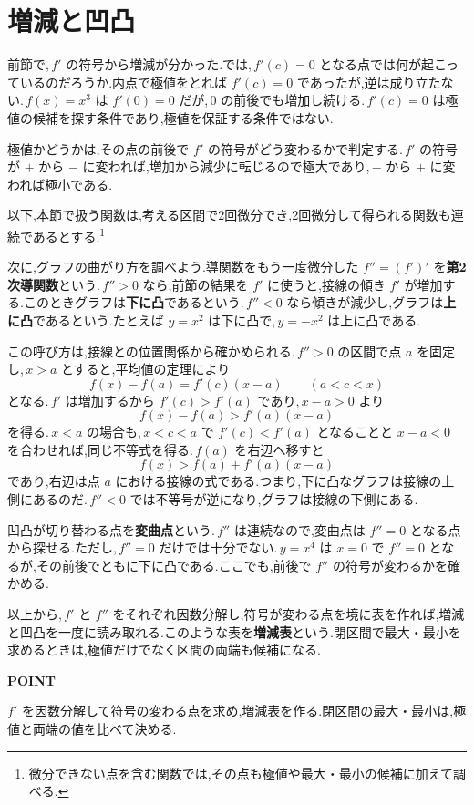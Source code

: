 \section{増減と凹凸}\label{節:増減凹凸}
前節で,\,$f'$ の符号から増減が分かった.では,\,$f'(c)=0$ となる点では何が起こっているのだろうか.内点で極値をとれば $f'(c)=0$ であったが,逆は成り立たない.\,$f(x)=x^3$ は $f'(0)=0$ だが,\,$0$ の前後でも増加し続ける.\,$f'(c)=0$ は極値の候補を探す条件であり,極値を保証する条件ではない.

極値かどうかは,その点の前後で $f'$ の符号がどう変わるかで判定する.\,$f'$ の符号が $+$ から $-$ に変われば,増加から減少に転じるので極大であり,\,$-$ から $+$ に変われば極小である.

以下,本節で扱う関数は,考える区間で2回微分でき,2回微分して得られる関数も連続であるとする.\footnote{微分できない点を含む関数では,その点も極値や最大・最小の候補に加えて調べる.}

次に,グラフの曲がり方を調べよう.導関数をもう一度微分した $f''=(f')'$ を\textbf{第2次導関数}という.\label{用語:第2次導関数}\,$f''>0$ なら,前節の結果を $f'$ に使うと,接線の傾き $f'$ が増加する.このときグラフは\textbf{下に凸}であるという.\,$f''<0$ なら傾きが減少し,グラフは\textbf{上に凸}であるという.たとえば $y=x^2$ は下に凸で,\,$y=-x^2$ は上に凸である.

この呼び方は,接線との位置関係から確かめられる.\,$f''>0$ の区間で点 $a$ を固定し,\,$x>a$ とすると,平均値の定理により
\[
 f(x)-f(a)=f'(c)(x-a)\qquad(a<c<x)
\]
となる.\,$f'$ は増加するから $f'(c)>f'(a)$ であり,\,$x-a>0$ より
\[
 f(x)-f(a)>f'(a)(x-a)
\]
を得る.\,$x<a$ の場合も,\,$x<c<a$ で $f'(c)<f'(a)$ となることと $x-a<0$ を合わせれば,同じ不等式を得る.\,$f(a)$ を右辺へ移すと
\[
 f(x)>f(a)+f'(a)(x-a)
\]
であり,右辺は点 $a$ における接線の式である.つまり,下に凸なグラフは接線の上側にあるのだ.\,$f''<0$ では不等号が逆になり,グラフは接線の下側にある.

凹凸が切り替わる点を\textbf{変曲点}という.\,$f''$ は連続なので,変曲点は $f''=0$ となる点から探せる.ただし,\,$f''=0$ だけでは十分でない.\,$y=x^4$ は $x=0$ で $f''=0$ となるが,その前後でともに下に凸である.ここでも,前後で $f''$ の符号が変わるかを確かめる.

以上から,\,$f'$ と $f''$ をそれぞれ因数分解し,符号が変わる点を境に表を作れば,増減と凹凸を一度に読み取れる.このような表を\textbf{増減表}という.閉区間で最大・最小を求めるときは,極値だけでなく区間の両端も候補になる.

\begin{bookpoint}
\textbf{POINT}\par
$f'$ を因数分解して符号の変わる点を求め,増減表を作る.閉区間の最大・最小は,極値と両端の値を比べて決める.
\end{bookpoint}

